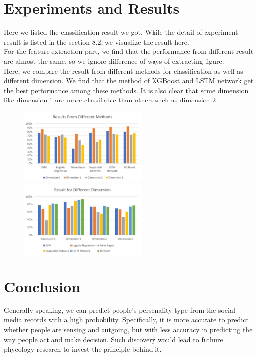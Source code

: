 \documentclass{article}
\begin{document}
\section{Experiments and Results}
Here we listed the classification result we got. While the detail of experiment result is listed in the section 8.2, we visualize the result here.\\
For the feature extraction part, we find that the performance from different result are almost the same, so we ignore difference of ways of extracting figure. \\
Here, we compare the result from different methods for classification as well as different dimension. We find that the method of XGBoost and LSTM network get the best performance among these methods. It is also clear that some dimension like dimension 1 are more classifiable than others such as dimension 2.
\begin{figure}[h]
	\centering
	\includegraphics[width=6.3cm]{fig/result1.jpg}
	\includegraphics[width=6.3cm]{fig/result2.jpg}
	\label{fig:result}
\end{figure}

\section{Conclusion}
Generally speaking, we can predict people's personality type from the social media records with a high probobility. Specifically, it is more accurate to predict whether people are sensing and outgoing, but with less accuracy in predicting the way people act and make decision. Such discovery would lead to futhure phycology research to invest the principle behind it.
\end{document}
